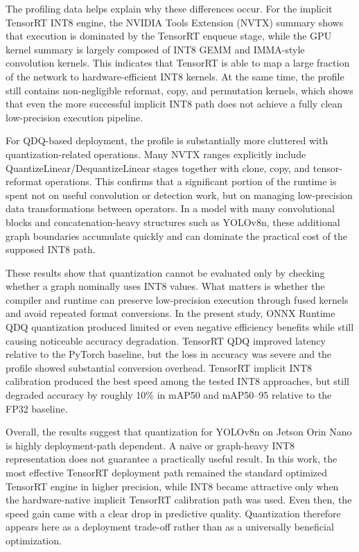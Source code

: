 \documentclass[12pt,a4paper]{report}
\begin{document}
The profiling data helps explain why these differences occur. For the implicit TensorRT INT8 engine, the NVIDIA Tools Extension (NVTX) summary
shows that execution is dominated by the TensorRT enqueue stage, while the GPU kernel summary is largely composed of
INT8 GEMM and IMMA-style convolution kernels. This indicates that TensorRT is able to map a large fraction of the
network to hardware-efficient INT8 kernels. At the same time, the profile still contains non-negligible reformat,
copy, and permutation kernels, which shows that even the more successful implicit INT8 path does not achieve a fully
clean low-precision execution pipeline.

For QDQ-based deployment, the profile is substantially more cluttered with quantization-related operations. Many NVTX
ranges explicitly include QuantizeLinear/DequantizeLinear stages together with clone, copy, and tensor-reformat
operations. This confirms that a significant portion of the runtime is spent not on useful convolution or detection
work, but on managing low-precision data transformations between operators. In a model with many convolutional blocks
and concatenation-heavy structures such as YOLOv8n, these additional graph boundaries accumulate quickly and can
dominate the practical cost of the supposed INT8 path.

These results show that quantization cannot be evaluated only by checking whether a graph nominally uses INT8 values.
What matters is whether the compiler and runtime can preserve low-precision execution through fused kernels and avoid
repeated format conversions. In the present study, ONNX Runtime QDQ quantization produced limited or even negative
efficiency benefits while still causing noticeable accuracy degradation. TensorRT QDQ improved latency relative to the
PyTorch baseline, but the loss in accuracy was severe and the profile showed substantial conversion overhead. TensorRT
implicit INT8 calibration produced the best speed among the tested INT8 approaches, but still degraded accuracy by
roughly 10\% in mAP50 and mAP50--95 relative to the FP32 baseline.

Overall, the results suggest that quantization for YOLOv8n on Jetson Orin Nano is highly deployment-path dependent. A
naive or graph-heavy INT8 representation does not guarantee a practically useful result. In this work, the most
effective TensorRT deployment path remained the standard optimized TensorRT engine in higher precision, while INT8
became attractive only when the hardware-native implicit TensorRT calibration path was used. Even then, the speed gain
came with a clear drop in predictive quality. Quantization therefore appears here as a deployment trade-off rather than
as a universally beneficial optimization.
\end{document}
